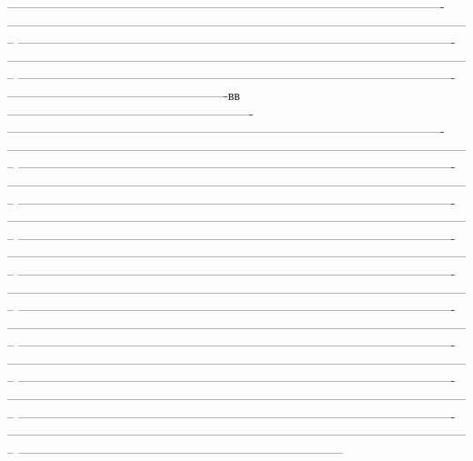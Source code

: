 \documentclass{article}
\begin{document}
-------------------------------------------------------------------------------------------------------
--------------------------------------------------------------------------------------------------------------
-------------------------------------------------------------------------------------------------------
--------------------------------------------------------------------------------------------------------------
-------------------------------------------------------------------------------------------------------
----------------------------------------------------вв----------------------------------------------------------
-------------------------------------------------------------------------------------------------------
--------------------------------------------------------------------------------------------------------------
-------------------------------------------------------------------------------------------------------
--------------------------------------------------------------------------------------------------------------
-------------------------------------------------------------------------------------------------------
--------------------------------------------------------------------------------------------------------------
-------------------------------------------------------------------------------------------------------
--------------------------------------------------------------------------------------------------------------
-------------------------------------------------------------------------------------------------------
--------------------------------------------------------------------------------------------------------------
-------------------------------------------------------------------------------------------------------
--------------------------------------------------------------------------------------------------------------
-------------------------------------------------------------------------------------------------------
--------------------------------------------------------------------------------------------------------------
-------------------------------------------------------------------------------------------------------
--------------------------------------------------------------------------------------------------------------
-------------------------------------------------------------------------------------------------------
--------------------------------------------------------------------------------------------------------------
-----------------------------------------------------------------------------
\end{document}
